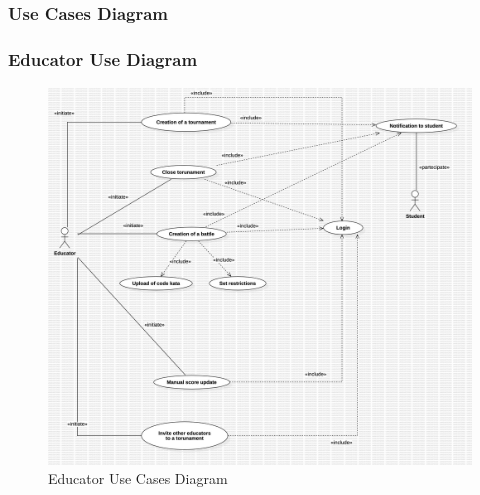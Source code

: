 \subsubsection{Use Cases Diagram}
\subsubsection*{Educator Use Diagram}
\begin{figure}[H]
    \centering
    \includegraphics[width=\textwidth]{Diagrams/EducatorUseCaseDiagram.jpg}
    \caption{Educator Use Cases Diagram}
    \label{fig:student-use-diagram}
\end{figure}


